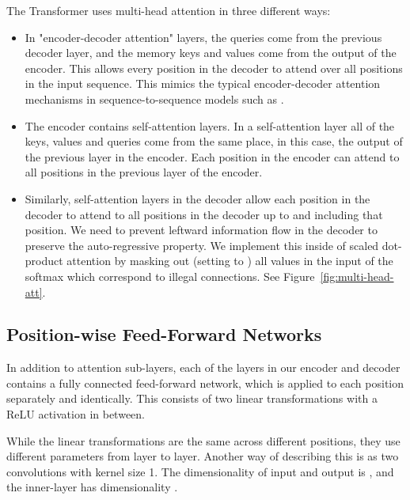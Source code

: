 \documentclass{article}
\begin{document}
The Transformer uses multi-head attention in three different ways: 
\begin{itemize}
 \item In "encoder-decoder attention" layers, the queries come from the previous decoder layer, and the memory keys and values come from the output of the encoder.   This allows every position in the decoder to attend over all positions in the input sequence.  This mimics the typical encoder-decoder attention mechanisms in sequence-to-sequence models such as \citep{wu2016google, bahdanau2014neural,JonasFaceNet2017}.

 \item The encoder contains self-attention layers.  In a self-attention layer all of the keys, values and queries come from the same place, in this case, the output of the previous layer in the encoder.   Each position in the encoder can attend to all positions in the previous layer of the encoder.

 \item Similarly, self-attention layers in the decoder allow each position in the decoder to attend to all positions in the decoder up to and including that position.  We need to prevent leftward information flow in the decoder to preserve the auto-regressive property.  We implement this inside of scaled dot-product attention by masking out (setting to ) all values in the input of the softmax which correspond to illegal connections.  See Figure~\ref{fig:multi-head-att}.

\end{itemize}

\subsection{Position-wise Feed-Forward Networks}\label{sec:ffn}

In addition to attention sub-layers, each of the layers in our encoder and decoder contains a fully connected feed-forward network, which is applied to each position separately and identically.  This consists of two linear transformations with a ReLU activation in between.



While the linear transformations are the same across different positions, they use different parameters from layer to layer. Another way of describing this is as two convolutions with kernel size 1.  The dimensionality of input and output is , and the inner-layer has dimensionality .
\end{document}
